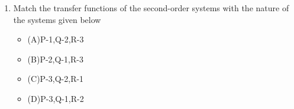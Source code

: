 \documentclass[journal,12pt,twocolumn]{IEEEtran}
\renewcommand\thesection{\arabic{section}}
\begin{document}
\begin{enumerate}[label=\arabic*.,ref=\thesection.\theenumi]
%
%
%
\item
Match the transfer functions of the second-order systems with the nature of the systems given below
\begin{itemize}
\item (A)P-1,Q-2,R-3
\item (B)P-2,Q-1,R-3
\item (C)P-3,Q-2,R-1
\item (D)P-3,Q-1,R-2


\end{itemize}
\end{enumerate}
\end{document}
